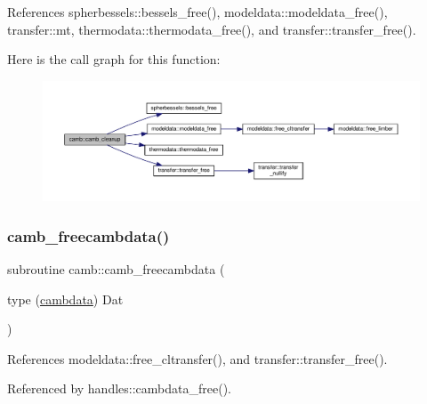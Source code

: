 References spherbessels\+::bessels\+\_\+free(), modeldata\+::modeldata\+\_\+free(), transfer\+::mt, thermodata\+::thermodata\+\_\+free(), and transfer\+::transfer\+\_\+free().

Here is the call graph for this function\+:
\nopagebreak
\begin{figure}[H]
\begin{center}
\leavevmode
\includegraphics[width=350pt]{namespacecamb_a70f3206a0056ea3ff96defbc4d2be548_cgraph}
\end{center}
\end{figure}
\mbox{\label{namespacecamb_a20b57e6f6098c5800cbf374d96307d13}} 
\subsubsection{\texorpdfstring{camb\+\_\+freecambdata()}{camb\_freecambdata()}}
{\footnotesize\ttfamily subroutine camb\+::camb\+\_\+freecambdata (\begin{DoxyParamCaption}\item[{type (\mbox{\hyperlink{structcamb_1_1cambdata}{cambdata}})}]{Dat }\end{DoxyParamCaption})}



References modeldata\+::free\+\_\+cltransfer(), and transfer\+::transfer\+\_\+free().



Referenced by handles\+::cambdata\+\_\+free().

